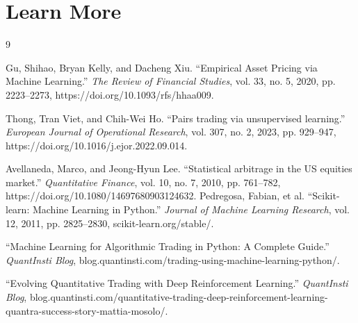\documentclass[11pt,a4paper]{article}
\begin{document}
\section{Learn More}

\begin{thebibliography}{9}

Gu, Shihao, Bryan Kelly, and Dacheng Xiu. ``Empirical Asset Pricing via Machine Learning.'' \textit{The Review of Financial Studies}, vol. 33, no. 5, 2020, pp. 2223--2273, https://doi.org/10.1093/rfs/hhaa009.

Thong, Tran Viet, and Chih-Wei Ho. ``Pairs trading via unsupervised learning.'' \textit{European Journal of Operational Research}, vol. 307, no. 2, 2023, pp. 929--947, https://doi.org/10.1016/j.ejor.2022.09.014.

Avellaneda, Marco, and Jeong-Hyun Lee. ``Statistical arbitrage in the US equities market.'' \textit{Quantitative Finance}, vol. 10, no. 7, 2010, pp. 761--782, https://doi.org/10.1080/14697680903124632.
Pedregosa, Fabian, et al. ``Scikit-learn: Machine Learning in Python.'' \textit{Journal of Machine Learning Research}, vol. 12, 2011, pp. 2825--2830, scikit-learn.org/stable/.

``Machine Learning for Algorithmic Trading in Python: A Complete Guide.'' \textit{QuantInsti Blog}, blog.quantinsti.com/trading-using-machine-learning-python/.

``Evolving Quantitative Trading with Deep Reinforcement Learning.'' \textit{QuantInsti Blog}, blog.quantinsti.com/quantitative-trading-deep-reinforcement-learning-quantra-success-story-mattia-mosolo/.

\end{thebibliography}
\end{document}
